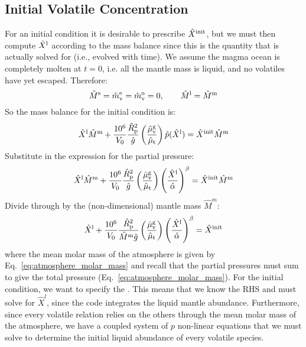 \subsection{Initial Volatile Concentration}
For an initial condition it is desirable to prescribe $\hat{X}^{\rm init}$, but we must then compute $\hat{X}^{\rm l}$ according to the mass balance since this is the quantity that is actually solved for (i.e., evolved with time).  We assume the magma ocean is completely molten at $t=0$, i.e. all the mantle mass is liquid, and no volatiles have yet escaped.  Therefore:
\begin{equation}
\hat{M}^{\rm s} = \hat{m}_{\rm v}^{\rm e} = \hat{m}_{\rm v}^{\rm o} = 0, \qquad \hat{M}^{\rm l} = \hat{M}^{\rm m}
\end{equation}
So the mass balance for the initial condition is:
\begin{equation}
\hat{X}^{\rm l} \hat{M}^{\rm m} + \frac{10^6}{V_0} \frac{\hat{R}_{\rm p}^2}{\hat{g}} \left( \frac{\hat{\mu}_{\rm v}^{\rm g}}{\hat{\mu}_{\rm t}} \right)\hat{p} (\hat{X}^{\rm l}) = \hat{X}^{\rm init} \hat{M}^{\rm m}
\end{equation}
Substitute in the expression for the partial pressure:
\begin{equation}
\hat{X}^{\rm l} \hat{M}^{\rm m} + \frac{10^6}{V_0} \frac{\hat{R}_{\rm p}^2}{\hat{g}} \left( \frac{\hat{\mu}_{\rm v}^{\rm g}}{\hat{\mu}_{\rm t}} \right)\left( \frac{\hat{X}^{\rm l}}{\hat{\alpha}} \right)^\beta = \hat{X}^{\rm init} \hat{M}^{\rm m}
\end{equation}
Divide through by the (non-dimensional) mantle mass $\hat{M}^m$:
\begin{equation}
\hat{X}^{\rm l} + \frac{10^6}{V_0} \frac{\hat{R}_{\rm p}^2}{\hat{M}^{\rm m} \hat{g}} \left( \frac{\hat{\mu}_{\rm v}^{\rm g}}{\hat{\mu}_{\rm t}} \right)\left( \frac{\hat{X}^{\rm l}}{\hat{\alpha}} \right)^\beta = \hat{X}^{\rm init}
\end{equation}
where the mean molar mass of the atmosphere is given by Eq.~\ref{eq:atmosphere_molar_mass} and recall that the partial pressures must sum to give the total pressure (Eq.~\ref{eq:atmosphere_molar_mass}).  For the initial condition, we want to specify the .  This means that we know the RHS and must solve for $\hat{X}^l$, since the code integrates the liquid mantle abundance.  Furthermore, since every volatile relation relies on the others through the mean molar mass of the atmosphere, we have a coupled system of $p$ non-linear equations that we must solve to determine the initial liquid abundance of every volatile species.
